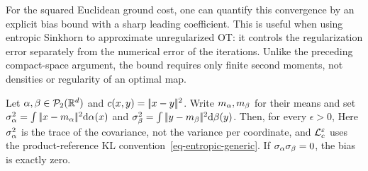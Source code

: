 For the squared Euclidean ground cost, one can quantify this convergence by an explicit bias bound with a sharp leading coefficient. This is useful when using entropic Sinkhorn to approximate unregularized OT: it controls the regularization error separately from the numerical error of the iterations. Unlike the preceding compact-space argument, the bound requires only finite second moments, not densities or regularity of an optimal map.

\begin{prop}\label{prop-quadratic-entropic-bias-bound}
Let $\alpha,\beta\in\mathcal{P}_2(\mathbb{R}^d)$ and $c(x,y)=|\!| x-y |\!|^2$. Write $m_\alpha,m_\beta$ for their means and set $\sigma_\alpha^2=\int|\!| x-m_\alpha |\!|^2\mathrm{d}\alpha(x)$ and $\sigma_\beta^2=\int|\!| y-m_\beta |\!|^2\mathrm{d}\beta(y)$. Then, for every $\epsilon>0$,
Here $\sigma_\alpha^2$ is the trace of the covariance, not the variance per coordinate, and $\mathcal{L}_c^\varepsilon$ uses the product-reference KL convention~\eqref{eq-entropic-generic}. If $\sigma_\alpha\sigma_\beta=0$, the bias is exactly zero.
\end{prop}

